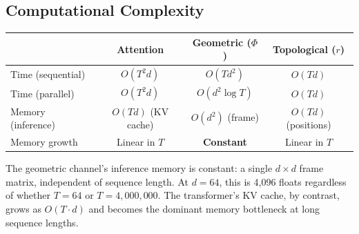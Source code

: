 \documentclass[11pt,a4paper]{article}
\theoremstyle{definition}
\theoremstyle{remark}
\begin{document}
\subsection{Computational Complexity}
\label{subsec:complexity}

\begin{center}
\begin{tabular}{lccc}
\toprule
& \textbf{Attention} & \textbf{Geometric ($\Phi$)} & \textbf{Topological ($r$)} \\
\midrule
Time (sequential) & $O(T^2 d)$ & $O(T d^2)$ & $O(T d)$ \\
Time (parallel) & $O(T^2 d)$ & $O(d^2 \log T)$ & $O(T d)$ \\
Memory (inference) & $O(T d)$ (KV cache) & $O(d^2)$ (frame) & $O(T d)$ (positions) \\
Memory growth & Linear in $T$ & \textbf{Constant} & Linear in $T$ \\
\bottomrule
\end{tabular}
\end{center}

\noindent The geometric channel's inference memory is constant: a 
single $d \times d$ frame matrix, independent of sequence length. 
At $d = 64$, this is 4{,}096 floats regardless of whether $T = 64$ 
or $T = 4{,}000{,}000$. The transformer's KV cache, by contrast, 
grows as $O(T \cdot d)$ and becomes the dominant memory bottleneck 
at long sequence lengths.
\end{document}
